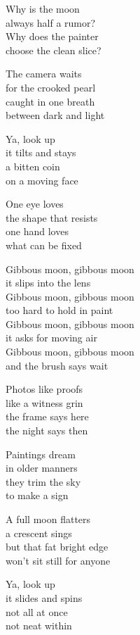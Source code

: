 \begin{lyrics}
Why is the moon\\
always half a rumor?\\
Why does the painter\\
choose the clean slice?

The camera waits\\
for the crooked pearl\\
caught in one breath\\
between dark and light

Ya, look up\\
it tilts and stays\\
a bitten coin\\
on a moving face

One eye loves\\
the shape that resists\\
one hand loves\\
what can be fixed

Gibbous moon, gibbous moon\\
it slips into the lens\\
Gibbous moon, gibbous moon\\
too hard to hold in paint\\
Gibbous moon, gibbous moon\\
it asks for moving air\\
Gibbous moon, gibbous moon\\
and the brush says wait

Photos like proofs\\
like a witness grin\\
the frame says here\\
the night says then

Paintings dream\\
in older manners\\
they trim the sky\\
to make a sign

A full moon flatters\\
a crescent sings\\
but that fat bright edge\\
won't sit still for anyone

Ya, look up\\
it slides and spins\\
not all at once\\
not neat within


\end{lyrics}
